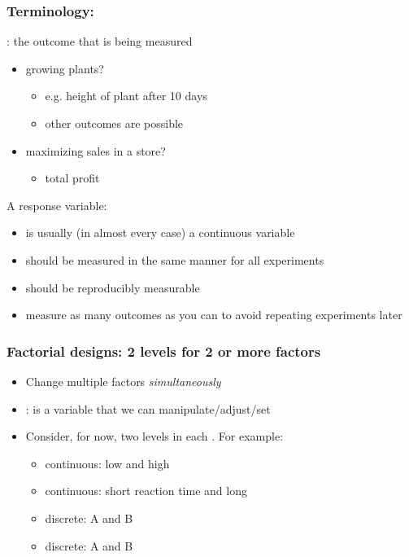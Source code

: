 \begin{frame}\frametitle{Terminology: {\color{purple}{Response}}}
	{\color{purple}{Response}}: the outcome that is being measured
	\begin{itemize}
		\item	growing plants? 
			\begin{itemize}
				\item	e.g. height of plant after 10 days
				\item	other outcomes are possible
			\end{itemize}
		\item	maximizing sales in a store? 
			\begin{itemize}
				\item	total profit
			\end{itemize}
	\end{itemize}
	
	\vspace{12pt}
	A response variable:
	\begin{itemize}
		\item	is usually (in almost every case) a continuous variable
		\item	should be measured in the same manner for all experiments
		\item	should be reproducibly measurable
		\item	measure as many outcomes as you can to avoid repeating experiments later
	\end{itemize}	
\end{frame}

\begin{frame}\frametitle{Factorial designs: 2 levels for 2 or more factors}
	\begin{itemize}
		\item	Change multiple factors \emph{simultaneously}
		\item	{\color{purple}{Factor}}: is a variable that we can manipulate/adjust/set
		\item	Consider, for now, two levels in each \textbf{{\color{myOrange}{factor}}}. For example:
		\begin{itemize}
			
			\item	continuous: low and high {\color{myOrange}{pH}}
			\item	continuous: short reaction time and long {\color{myOrange}{reaction time}}
			\item	discrete: {\color{myOrange}{catalyst}} A and B
			\item	discrete: {\color{myOrange}{mixing system}} A and B
		\end{itemize}
	\end{itemize}
\end{frame}

